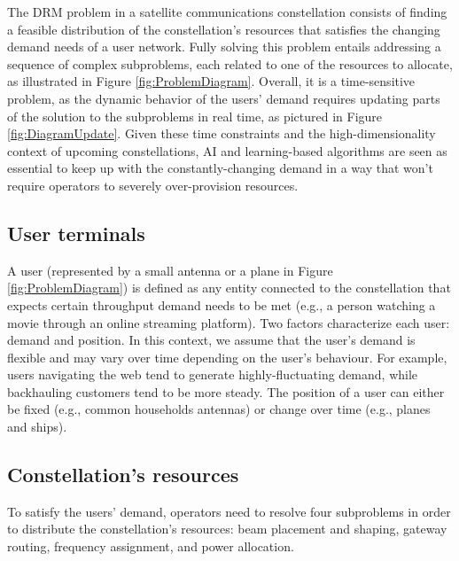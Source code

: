 \documentclass[letterpaper]{article} %
\begin{document}
The DRM problem in a satellite communications constellation consists of finding a feasible distribution of the constellation's resources that satisfies the changing demand needs of a user network. Fully solving this problem entails addressing a sequence of complex subproblems, each related to one of the resources to allocate, as illustrated in Figure \ref{fig:ProblemDiagram}. Overall, it is a time-sensitive problem, as the dynamic behavior of the users' demand requires updating parts of the solution to the subproblems in real time, as pictured in Figure \ref{fig:DiagramUpdate}. Given these time constraints and the high-dimensionality context of upcoming constellations, AI and learning-based algorithms are seen as essential to keep up with the constantly-changing demand in a way that won't require operators to severely over-provision resources.


\subsection{User terminals}
A user (represented by a small antenna or a plane in Figure \ref{fig:ProblemDiagram}) is defined as any entity connected to the constellation that expects certain throughput demand needs to be met (e.g., a person watching a movie through an online streaming platform). Two factors characterize each user: demand and position. In this context, we assume that the user's demand is flexible and may vary over time depending on the user's behaviour. For example, users navigating the web tend to generate highly-fluctuating demand, while backhauling customers tend to be more steady. The position of a user can either be fixed (e.g., common households antennas) or change over time (e.g., planes and ships).


\subsection{Constellation's resources}
To satisfy the users' demand, operators need to resolve four subproblems in order to distribute the constellation's resources: beam placement and shaping, gateway routing, frequency assignment, and power allocation.
\end{document}
